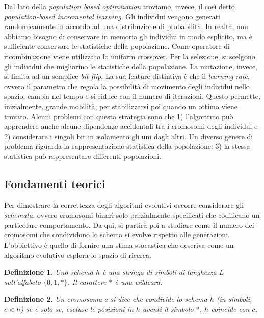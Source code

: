 \documentclass[10pt,a4paper]{article}
\newtheorem{definition}{Definizione}
\begin{document}
Dal lato della \emph{population based optimization} troviamo, invece, il così detto \emph{population-based incremental learning}. Gli individui vengono generati randomicamente in accordo ad una distribuzione di probabilità. In realtà, non abbiamo bisogno di conservare in memoria gli individui in modo esplicito, ma è sufficiente conservare le statistiche della popolazione. Come operatore di ricombinazione viene utilizzato lo uniform crossover. Per la selezione, si scelgono gli individui che migliorino le statistiche della popolazione. La mutazione, invece, si limita ad un semplice \emph{bit-flip}. La sua feature distintiva è che il \emph{learning rate}, ovvero il parametro che regola la possibilità di movimento degli individui nello spazio, cambia nel tempo e si riduce con il numero di iterazioni. Questo permette, inizialmente, grande mobilità, per stabilizzarsi poi quando un ottimo viene trovato. Alcuni problemi con questa strategia sono che 1) l'algoritmo può apprendere anche alcune dipendenze accidentali tra i cromosomi degli individui e 2) considerare i singoli bit in isolamento gli uni dagli altri. Un diverso genere di problema riguarda la rappresentazione statistica della popolazione: 3) la stessa statistica può rappresentare differenti popolazioni.

\subsection{Fondamenti teorici}

Per dimostrare la correttezza degli algoritmi evolutivi occorre considerare gli \emph{schemata}, ovvero cromosomi binari solo parzialmente specificati che codificano un particolare comportamento. Da qui, si partirà poi a studiare come il numero dei cromosomi che condividono lo schema si evolve rispetto alle generazioni. L'obbiettivo è quello di fornire una stima stocastica che descriva come un algoritmo evolutivo esplora lo spazio di ricerca.

\begin{definition}
Uno \emph{schema} $h$ è una stringa di simboli di lunghezza $L$ sull'alfabeto $\{0,1,*\}$. Il carattere $*$ è una wildcard.
\end{definition}

\begin{definition}
Un cromosoma $c$ si dice che \emph{condivide} lo schema $h$ (in simboli, $c \triangleleft h$) se e solo se, escluse le posizioni in $h$ aventi il simbolo $*$, $h$ coincide con $c$.
\end{definition}
\end{document}
